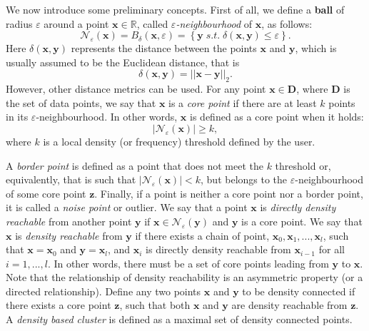 \documentclass[a4paper]{article}
\begin{document}
	We now introduce some preliminary concepts. First of all, we define a \textbf{ball} of radius $\varepsilon$ around a point $\boldsymbol{x} \in \mathbb{R}$, called \textit{$\varepsilon$-neighbourhood} of $\boldsymbol{x}$, as follows:
	\begin{equation*}
	\mathcal{N}_{\varepsilon} (\boldsymbol{x}) = B_{\delta}\left( \boldsymbol{x}, \varepsilon \right) = \left\{ \boldsymbol{y} \; s.t. \; \delta \left( \boldsymbol{x}, \boldsymbol{y} \right) \leq \varepsilon \right\}.
	\end{equation*}
	Here $\delta \left( \boldsymbol{x}, \boldsymbol{y} \right)$ represents the distance between the points $\boldsymbol{x}$ and $\boldsymbol{y}$, which is usually assumed to be the Euclidean distance, that is
	\begin{equation*}
	\delta(\boldsymbol{x}, \boldsymbol{y}) = || \boldsymbol{x} - \boldsymbol{y} ||_{2}.
	\end{equation*}
	However, other distance metrics can be used.
	For any point $\boldsymbol{x} \in \boldsymbol{D}$, where $\boldsymbol{D}$ is the set of data points, we say that $\boldsymbol{x}$ is a \textit{core point} if there are at least $k$ points in its $\varepsilon$-neighbourhood.
	In other words, $\boldsymbol{x}$ is defined as a core point when it holds:
	\begin{equation*}
	| \mathcal{N}_{\varepsilon}(\boldsymbol{x})| \geq k,
	\end{equation*}
	where $k$ is a local density (or frequency) threshold defined by the user.

	A \textit{border point} is defined as a point that does not meet the $k$ threshold or, equivalently, that is such that $|\mathcal{N}_{\varepsilon}(\boldsymbol{x})| < k$, but belongs to the $\varepsilon$-neighbourhood of some core point $\boldsymbol{z}$.
	Finally, if a point is neither a core point nor a border point, it is called a \textit{noise point} or outlier.
	We say that a point $\boldsymbol{x}$ is \textit{directly density reachable} from another point $\boldsymbol{y}$ if $\boldsymbol{x} \in \mathcal{N}_{\varepsilon} \left( \boldsymbol{y} \right)$ and $\boldsymbol{y}$ is a core point.
	We say that $\boldsymbol{x}$ is \textit{density reachable} from $\boldsymbol{y}$ if there exists a chain of point, $\boldsymbol{x}_{0}, \boldsymbol{x}_{1}, ..., \boldsymbol{x}_{l}$, such that $\boldsymbol{x}=\boldsymbol{x}_{0}$ and $\boldsymbol{y} = \boldsymbol{x}_{l}$, and $\boldsymbol{x}_{i}$ is directly density reachable from $\boldsymbol{x}_{i-1}$ for all $i=1,...,l$.
	In other words, there must be a set of core points leading from $\boldsymbol{y}$ to $\boldsymbol{x}$. Note that the relationship of density reachability is an asymmetric property (or a directed relationship).
	Define any two points $\boldsymbol{x}$ and $\boldsymbol{y}$ to be density connected if there exists a core point $\boldsymbol{z}$, such that both $\boldsymbol{x}$ and $\boldsymbol{y}$ are density reachable from $\boldsymbol{z}$.
	A \textit{density based cluster} is defined as a maximal set of density connected points.
\end{document}
